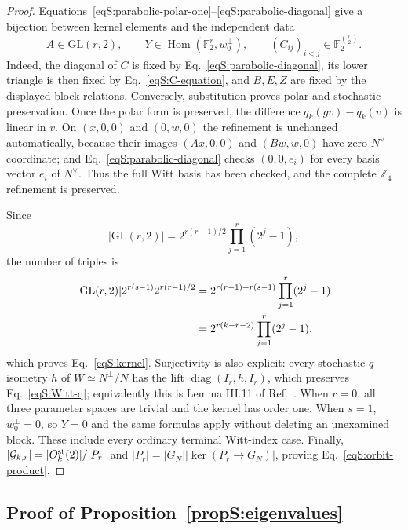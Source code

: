 \documentclass[journal,twocolumn]{IEEEtran}
\theoremstyle{definition}
\theoremstyle{plain}
\newcommand{\F}{\mathbb F}
\newcommand{\cG}{\mathcal G}
\begin{document}
\begin{proof}
Equations~\eqref{eqS:parabolic-polar-one}--\eqref{eqS:parabolic-diagonal}
give a bijection between kernel elements and the independent data
\begin{equation}
 A\in\mathrm{GL}(r,2),\qquad
 Y\in\operatorname{Hom}(\F_2^r,w_0^\perp),\qquad
 (C_{ij})_{i<j}\in\F_2^{\binom r2}.
 \label{eqS:kernel-data}
\end{equation}
Indeed, the diagonal of $C$ is fixed by
Eq.~\eqref{eqS:parabolic-diagonal}, its lower triangle is then fixed by
Eq.~\eqref{eqS:C-equation}, and $B,E,Z$ are fixed by the displayed block
relations.  Conversely, substitution proves polar and stochastic
preservation.  Once the polar form is preserved, the difference
$q_k(gv)-q_k(v)$ is linear in $v$.  On $(x,0,0)$ and $(0,w,0)$ the
refinement is unchanged automatically, because their images $(Ax,0,0)$
and $(Bw,w,0)$ have zero $N^\vee$ coordinate; and
Eq.~\eqref{eqS:parabolic-diagonal} checks $(0,0,e_i)$ for every basis
vector $e_i$ of $N^\vee$.  Thus the full Witt basis has been checked, and
the complete $\mathbb Z_4$ refinement is preserved.

Since
\begin{equation}
 |\mathrm{GL}(r,2)|
 =2^{r(r-1)/2}\prod_{j=1}^{r}(2^j-1),
 \end{equation}
the number of triples is
\begin{align}
 |\mathrm{GL}(r,2)|
 2^{r(s-1)}2^{r(r-1)/2}
 &=2^{r(r-1)+r(s-1)}\prod_{j=1}^{r}(2^j-1)\notag\\
 &=2^{r(k-r-2)}\prod_{j=1}^{r}(2^j-1),
 \end{align}
which proves Eq.~\eqref{eqS:kernel}.  Surjectivity is also explicit: every
stochastic $q$-isometry $h$ of $W\simeq N^\perp/N$ has the lift
$\operatorname{diag}(I_r,h,I_r)$, which preserves
Eq.~\eqref{eqS:Witt-q}; equivalently this is Lemma III.11 of
Ref.~\cite{MontealegreGross2025}.  When $r=0$, all three parameter spaces
are trivial and the kernel has order one.  When $s=1$,
$w_0^\perp=0$, so $Y=0$ and the same formulas apply without deleting an
unexamined block.  These include every ordinary terminal Witt-index case.
Finally,
$|\cG_{k,r}|=|O_k^{\rm st}(2)|/|P_r|$ and
$|P_r|=|G_N||\ker(P_r\to G_N)|$, proving
Eq.~\eqref{eqS:orbit-product}.
\end{proof}

\subsection{Proof of Proposition~\ref{propS:eigenvalues}}
\label{app:proof-eigenvalues}
\end{document}
